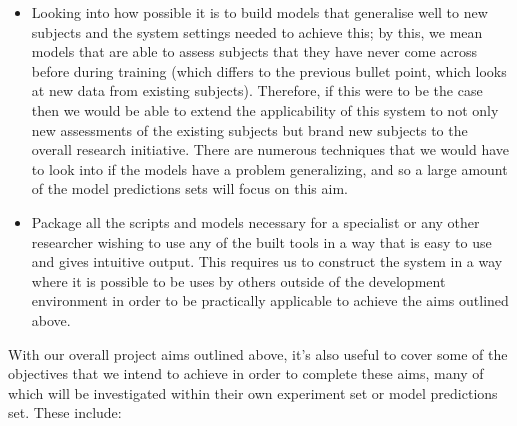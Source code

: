 \documentclass[12pt,twoside]{report}
\begin{document}
\begin{itemize}
	\item Looking into how possible it is to build models that generalise well to new subjects and the system settings needed to achieve this; by this, we mean models that are able to assess subjects that they have never come across before during training (which differs to the previous bullet point, which looks at new data from existing subjects). Therefore, if this were to be the case then we would be able to extend the applicability of this system to not only new assessments of the existing subjects but brand new subjects to the overall research initiative. There are numerous techniques that we would have to look into if the models have a problem generalizing, and so a large amount of the model predictions sets will focus on this aim.
	\item Package all the scripts and models necessary for a specialist or any other researcher wishing to use any of the built tools in a way that is easy to use and gives intuitive output. This requires us to construct the system in a way where it is possible to be uses by others outside of the development environment in order to be practically applicable to achieve the aims outlined above.\\
\end{itemize}

\quad With our overall project aims outlined above, it’s also useful to cover some of the objectives that we intend to achieve in order to complete these aims, many of which will be investigated within their own experiment set or model predictions set. These include:
\end{document}
